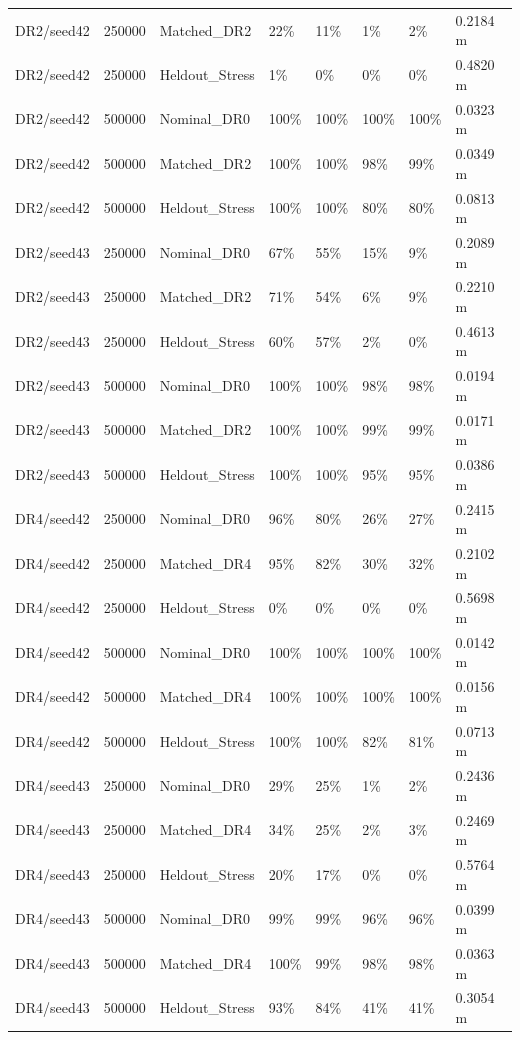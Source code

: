 \documentclass[11pt,a4paper,oneside]{book}
\begin{document}
\begin{longtable}{l l l l l l l l}
DR2/seed42 & 250000 & Matched\_DR2 & 22\% & 11\% & 1\% & 2\% & 0.2184 m \\
DR2/seed42 & 250000 & Heldout\_Stress & 1\% & 0\% & 0\% & 0\% & 0.4820 m \\
DR2/seed42 & 500000 & Nominal\_DR0 & 100\% & 100\% & 100\% & 100\% & 0.0323 m \\
DR2/seed42 & 500000 & Matched\_DR2 & 100\% & 100\% & 98\% & 99\% & 0.0349 m \\
DR2/seed42 & 500000 & Heldout\_Stress & 100\% & 100\% & 80\% & 80\% & 0.0813 m \\
DR2/seed43 & 250000 & Nominal\_DR0 & 67\% & 55\% & 15\% & 9\% & 0.2089 m \\
DR2/seed43 & 250000 & Matched\_DR2 & 71\% & 54\% & 6\% & 9\% & 0.2210 m \\
DR2/seed43 & 250000 & Heldout\_Stress & 60\% & 57\% & 2\% & 0\% & 0.4613 m \\
DR2/seed43 & 500000 & Nominal\_DR0 & 100\% & 100\% & 98\% & 98\% & 0.0194 m \\
DR2/seed43 & 500000 & Matched\_DR2 & 100\% & 100\% & 99\% & 99\% & 0.0171 m \\
DR2/seed43 & 500000 & Heldout\_Stress & 100\% & 100\% & 95\% & 95\% & 0.0386 m \\
DR4/seed42 & 250000 & Nominal\_DR0 & 96\% & 80\% & 26\% & 27\% & 0.2415 m \\
DR4/seed42 & 250000 & Matched\_DR4 & 95\% & 82\% & 30\% & 32\% & 0.2102 m \\
DR4/seed42 & 250000 & Heldout\_Stress & 0\% & 0\% & 0\% & 0\% & 0.5698 m \\
DR4/seed42 & 500000 & Nominal\_DR0 & 100\% & 100\% & 100\% & 100\% & 0.0142 m \\
DR4/seed42 & 500000 & Matched\_DR4 & 100\% & 100\% & 100\% & 100\% & 0.0156 m \\
DR4/seed42 & 500000 & Heldout\_Stress & 100\% & 100\% & 82\% & 81\% & 0.0713 m \\
DR4/seed43 & 250000 & Nominal\_DR0 & 29\% & 25\% & 1\% & 2\% & 0.2436 m \\
DR4/seed43 & 250000 & Matched\_DR4 & 34\% & 25\% & 2\% & 3\% & 0.2469 m \\
DR4/seed43 & 250000 & Heldout\_Stress & 20\% & 17\% & 0\% & 0\% & 0.5764 m \\
DR4/seed43 & 500000 & Nominal\_DR0 & 99\% & 99\% & 96\% & 96\% & 0.0399 m \\
DR4/seed43 & 500000 & Matched\_DR4 & 100\% & 99\% & 98\% & 98\% & 0.0363 m \\
DR4/seed43 & 500000 & Heldout\_Stress & 93\% & 84\% & 41\% & 41\% & 0.3054 m \\
\bottomrule \end{longtable}
\end{document}
